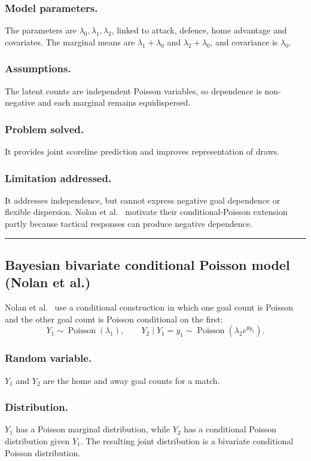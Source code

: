\documentclass[11pt,a4paper]{amsart}
\numberwithin{equation}{section}
\begin{document}
\subsubsection*{Model parameters.} The parameters are $\lambda_0,\lambda_1,\lambda_2$, linked to attack, defence, home advantage and covariates. The marginal means are $\lambda_1+\lambda_0$ and $\lambda_2+\lambda_0$, and covariance is $\lambda_0$.
\subsubsection*{Assumptions.} The latent counts are independent Poisson variables, so dependence is non-negative and each marginal remains equidispersed.
\subsubsection*{Problem solved.} It provides joint scoreline prediction and improves representation of draws.
\subsubsection*{Limitation addressed.} It addresses independence, but cannot express negative goal dependence or flexible dispersion. Nolan et al.~\cite{nolan2026} motivate their conditional-Poisson extension partly because tactical responses can produce negative dependence.

\noindent\rule{\textwidth}{0.4pt}

\subsection{Bayesian bivariate conditional Poisson model (Nolan et al.)}
Nolan et al.~\cite{nolan2026} use a conditional construction in which one goal count is
Poisson and the other goal count is Poisson conditional on the first:
\begin{equation}
Y_1\sim\operatorname{Poisson}(\lambda_1),\qquad
Y_2\mid Y_1=y_1\sim\operatorname{Poisson}\!\left(\lambda_2e^{\theta y_1}\right).
\end{equation}

\subsubsection*{Random variable.} $Y_1$ and $Y_2$ are the home and away goal counts for a match.
\subsubsection*{Distribution.} $Y_1$ has a Poisson marginal distribution, while $Y_2$ has a conditional Poisson distribution given $Y_1$. The resulting joint distribution is a bivariate conditional Poisson distribution.
\end{document}
